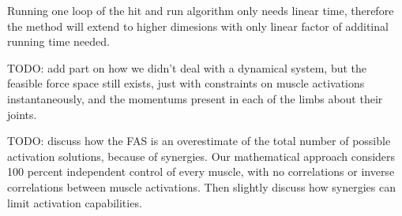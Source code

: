 Running one loop of the hit and run algorithm only needs linear time, therefore the method will extend to higher dimesions with only linear factor of additinal running time needed.

TODO: add part on how we didn't deal with a dynamical system, but the feasible force space still exists, just with constraints on muscle activations instantaneously, and the momentums present in each of the limbs about their joints.

TODO: discuss how the FAS is an overestimate of the total number of possible activation solutions, because of synergies. Our mathematical approach considers 100 percent independent control of every muscle, with no correlations or inverse correlations between muscle activations. Then slightly discuss how synergies can limit activation capabilities.